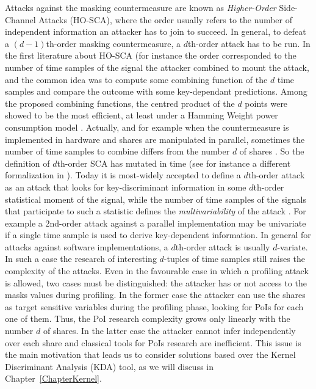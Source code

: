 Attacks against the masking countermeasure are known as \emph{Higher-Order} Side-Channel Attacks (HO-SCA), where the order usually refers to the number of independent information an attacker has to join to succeed. In general, to defeat a $(d-1)$th-order masking countermeasure, a $d$th-order attack has to be run. In the first literature about HO-SCA (for instance \cite{messerges2000using,Waddle2004,joye2005second,oswald2006practical} the order corresponded to the number of time samples of the signal the attacker combined to mount the attack, and the common idea was to compute some combining function of the $d$ time samples and compare the outcome with some key-dependant predictions. Among the proposed combining functions, the centred product of the $d$ points were showed to be the most efficient, at least under a Hamming Weight power consumption model \cite{DBLP:journals/tc/ProuffRB09}. Actually, and for example when the countermeasure is implemented in hardware and shares are manipulated in parallel, sometimes the number of time samples to combine differs from the number $d$ of shares \cite{peeters2005improved,standaert2005masking}. So the definition of $d$th-order SCA has mutated in time (see for instance a different formalization in \cite{piret2008security}). Today it is most-widely accepted to define a $d$th-order attack as an attack that looks for key-discriminant information in some $d$th-order statistical moment of the signal, while the number of time samples of the signals that participate to such a statistic defines the \emph{multivariability} of the attack \cite{gierlichs2010revisiting,batina2011mutual,carlet2014achieving}. For example a $2$nd-order attack against a parallel implementation may be univariate if a single time sample is used to derive key-dependent information. In general for attacks against software implementations, a $d$th-order attack is usually $d$-variate. In such a case the research of interesting $d$-tuples of time samples still raises the complexity of the attacks. Even in the favourable case in which a profiling attack is allowed, two cases must be distinguished: the attacker has or not access to the masks values during profiling. In the former case the attacker can use the shares as target sensitive variables during the profiling phase, looking for PoIs for each one of them. Thus, the PoI research complexity grows only linearly with the number $d$ of shares. In the latter case the attacker cannot infer independently over each share and classical tools for PoIs research are inefficient. This issue is the main motivation that leads us to consider solutions based over the Kernel Discriminant Analysis (KDA) tool, as we will discuss in Chapter~\ref{ChapterKernel}.




